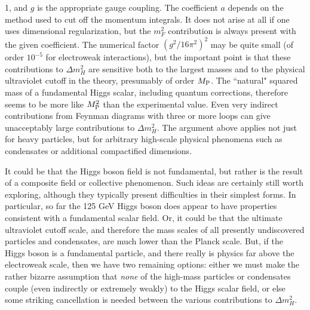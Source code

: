 \documentclass[11pt]{article}
\def\MPlanck{M_{\rm P}}
\begin{document}
1, and $g$ is the appropriate gauge coupling. The coefficient $a$ depends 
on the method used to cut off the momentum integrals. It does not arise at 
all if one uses dimensional regularization, but the $m_F^2$ contribution 
is always present with the given coefficient. The numerical factor 
$(g^2/16 \pi^2)^2$ may be quite small (of order $10^{-5}$ for electroweak 
interactions), but the important point is that these contributions to 
$\Delta m_H^2$ are sensitive both to the largest masses and to the 
physical ultraviolet cutoff in the theory, presumably of order $\MPlanck$. The 
``natural" squared mass of a fundamental Higgs scalar, including quantum 
corrections, therefore seems to be more like $\MPlanck^2$ than the 
experimental value. Even very indirect contributions from 
Feynman diagrams with three or more loops can give unacceptably large 
contributions to $\Delta m_H^2$. The argument above applies not just for 
heavy particles, but for arbitrary high-scale physical phenomena such as 
condensates or additional compactified dimensions.

It could be that the Higgs boson field is not fundamental, but rather is the result of
a composite field or collective phenomenon. Such ideas are certainly still worth
exploring, although they typically present difficulties in their simplest
forms. In particular, so far the 125 GeV Higgs boson does appear to have properties
consistent with a fundamental scalar field. Or, it could be that the ultimate 
ultraviolet cutoff scale, and therefore the mass scales of all presently undiscovered particles and condensates, are much lower than the Planck scale. 
But, if the Higgs boson is a fundamental particle, and there really
is physics far above the electroweak scale, then we have two remaining
options: either we must make the rather bizarre assumption that {\it none} of the
high-mass particles or condensates couple (even
indirectly or extremely weakly) to the Higgs scalar field, or else some
striking cancellation is needed between the various contributions to
$\Delta m_H^2$. 
\end{document}
